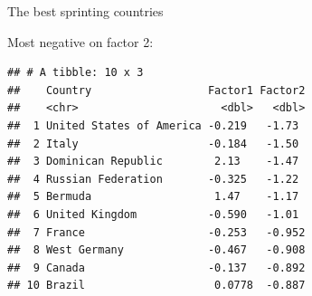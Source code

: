 \documentclass[
  ignorenonframetext,
]{beamer}
\newenvironment{Shaded}{\begin{snugshade}}{\end{snugshade}}
\newcommand{\DataTypeTok}[1]{\textcolor[rgb]{0.13,0.29,0.53}{#1}}
\newcommand{\DecValTok}[1]{\textcolor[rgb]{0.00,0.00,0.81}{#1}}
\newcommand{\KeywordTok}[1]{\textcolor[rgb]{0.13,0.29,0.53}{\textbf{#1}}}
\newcommand{\NormalTok}[1]{#1}
\newcommand{\OperatorTok}[1]{\textcolor[rgb]{0.81,0.36,0.00}{\textbf{#1}}}
\newcommand{\StringTok}[1]{\textcolor[rgb]{0.31,0.60,0.02}{#1}}
\begin{document}
\begin{frame}[fragile]{The best sprinting countries}
\protect\hypertarget{the-best-sprinting-countries}{}

Most negative on factor 2:

\footnotesize

\begin{Shaded}
\end{Shaded}

\begin{verbatim}
## # A tibble: 10 x 3
##    Country                  Factor1 Factor2
##    <chr>                      <dbl>   <dbl>
##  1 United States of America -0.219   -1.73 
##  2 Italy                    -0.184   -1.50 
##  3 Dominican Republic        2.13    -1.47 
##  4 Russian Federation       -0.325   -1.22 
##  5 Bermuda                   1.47    -1.17 
##  6 United Kingdom           -0.590   -1.01 
##  7 France                   -0.253   -0.952
##  8 West Germany             -0.467   -0.908
##  9 Canada                   -0.137   -0.892
## 10 Brazil                    0.0778  -0.887
\end{verbatim}

\normalsize

\end{frame}
\end{document}
